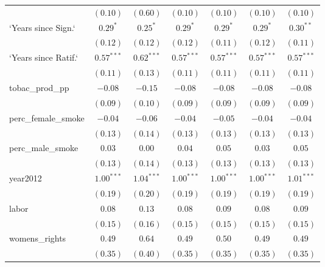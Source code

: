 \begin{table}[!h]
\begin{center}
\begin{tabular}{l c c c c c c }
                        & $(0.10)$      & $(0.60)$     & $(0.10)$      & $(0.10)$      & $(0.10)$      & $(0.10)$      \\
`Years since Sign.`     & $0.29^{*}$    & $0.25^{*}$   & $0.29^{*}$    & $0.29^{*}$    & $0.29^{*}$    & $0.30^{**}$   \\
                        & $(0.12)$      & $(0.12)$     & $(0.12)$      & $(0.11)$      & $(0.12)$      & $(0.11)$      \\
`Years since Ratif.`    & $0.57^{***}$  & $0.62^{***}$ & $0.57^{***}$  & $0.57^{***}$  & $0.57^{***}$  & $0.57^{***}$  \\
                        & $(0.11)$      & $(0.13)$     & $(0.11)$      & $(0.11)$      & $(0.11)$      & $(0.11)$      \\
tobac\_prod\_pp         & $-0.08$       & $-0.15$      & $-0.08$       & $-0.08$       & $-0.08$       & $-0.08$       \\
                        & $(0.09)$      & $(0.10)$     & $(0.09)$      & $(0.09)$      & $(0.09)$      & $(0.09)$      \\
perc\_female\_smoke     & $-0.04$       & $-0.06$      & $-0.04$       & $-0.05$       & $-0.04$       & $-0.04$       \\
                        & $(0.13)$      & $(0.14)$     & $(0.13)$      & $(0.13)$      & $(0.13)$      & $(0.13)$      \\
perc\_male\_smoke       & $0.03$        & $0.00$       & $0.04$        & $0.05$        & $0.03$        & $0.05$        \\
                        & $(0.13)$      & $(0.14)$     & $(0.13)$      & $(0.13)$      & $(0.13)$      & $(0.13)$      \\
year2012                & $1.00^{***}$  & $1.04^{***}$ & $1.00^{***}$  & $1.00^{***}$  & $1.00^{***}$  & $1.01^{***}$  \\
                        & $(0.19)$      & $(0.20)$     & $(0.19)$      & $(0.19)$      & $(0.19)$      & $(0.19)$      \\
labor                   & $0.08$        & $0.13$       & $0.08$        & $0.09$        & $0.08$        & $0.09$        \\
                        & $(0.15)$      & $(0.16)$     & $(0.15)$      & $(0.15)$      & $(0.15)$      & $(0.15)$      \\
womens\_rights          & $0.49$        & $0.64$       & $0.49$        & $0.50$        & $0.49$        & $0.49$        \\
                        & $(0.35)$      & $(0.40)$     & $(0.35)$      & $(0.35)$      & $(0.35)$      & $(0.35)$      \\

\end{tabular}
\end{center}
\end{table}
